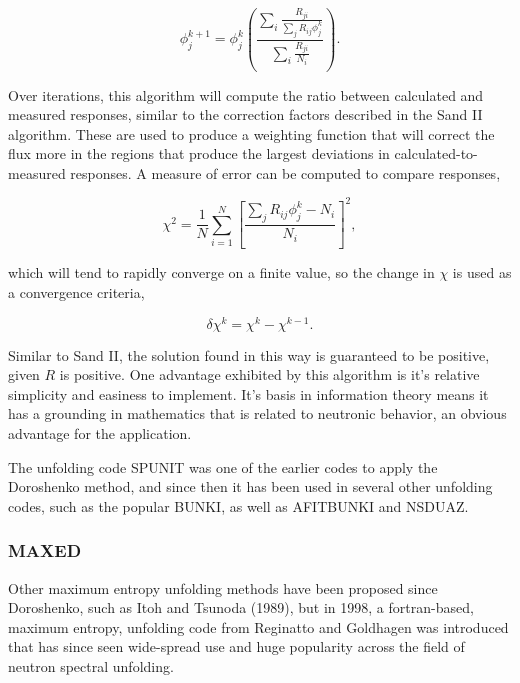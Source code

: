 \begin{equation}
\label{eqn:doroshenko}
\phi_j^{k + 1} = \phi_j^{k} (\frac{\sum_i \frac{R_{ji}}{\sum_j R_{ij} \phi_j^k}}{\sum_i \frac{R_{ji}}{N_i}}) .
\end{equation}

Over iterations, this algorithm will compute the ratio between calculated and measured responses, similar to the correction factors described in the Sand II algorithm.
These are used to produce a weighting function that will correct the flux more in the regions that produce the largest deviations in calculated-to-measured responses.
A measure of error can be computed to compare responses,

\begin{equation}
\label{eqn:doroshenko-error}
\chi^2 = \frac{1}{N} \sum_{i=1}^N [\frac{\sum_j R_{ij} \phi_j^k - N_i}{N_i}]^2 ,
\end{equation}

which will tend to rapidly converge on a finite value, so the change in $\chi$ is used as a convergence criteria,

\begin{equation}
\label{eqn:doroshenko-error-delta}
\delta \chi^k = \chi^k - \chi^{k-1} .
\end{equation}

Similar to Sand II, the solution found in this way is guaranteed to be positive, given $R$ is positive.
One advantage exhibited by this algorithm is it's relative simplicity and easiness to implement.
It's basis in information theory means it has a grounding in mathematics that is related to neutronic behavior, an obvious advantage for the application.

The unfolding code SPUNIT was one of the earlier codes to apply the Doroshenko method, and since then it has been used in several other unfolding codes, such as the popular BUNKI, as well as AFITBUNKI and NSDUAZ.




\subsubsection{MAXED}

Other maximum entropy unfolding methods have been proposed since Doroshenko, such as Itoh and Tsunoda (1989), but in 1998, a fortran-based, maximum entropy, unfolding code from Reginatto and Goldhagen was introduced that has since seen wide-spread use and huge popularity across the field of neutron spectral unfolding.

